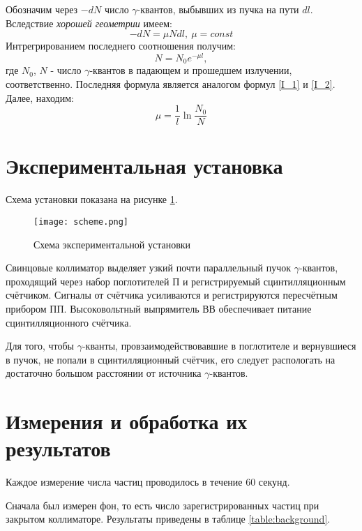 \documentclass[12pt, a4paper, reqno]{article}
\begin{document}
    Обозначим через $-dN$ число $\gamma$-квантов, выбывших из пучка на пути $dl$. Вследствие
    \textit{хорошей геометрии} имеем:
    \begin{equation*}
        -dN = \mu N dl,\ \mu = const
    \end{equation*}
    Интрегрированием последнего соотношения получим:
    \begin{equation*}
        N = N_0 e^{-\mu l},
    \end{equation*}
    где $N_0$, $N$ - число $\gamma$-квантов в падающем и прошедшем излучении, соответственно.
    Последняя формула является аналогом формул \eqref{I_1} и \eqref{I_2}. Далее, находим:
    \begin{equation}\label{mu_coeff}
        \boxed{\mu = \frac{1}{l}\ln{\frac{N_0}{N}}}
    \end{equation}

\newpage
\section{Экспериментальная установка}

    Схема установки показана на рисунке \ref{fig:scheme}.
    \begin{figure}[H]
        \centering
        \caption{Схема экспериментальной установки}
        \texttt{[image: scheme.png]}
        \label{fig:scheme}
    \end{figure}

    Свинцовые коллиматор выделяет узкий почти параллельный пучок $\gamma$-квантов, проходящий через
    набор поглотителей П и регистрируемый сцинтилляционным счётчиком. Сигналы от счётчика
    усиливаются и регистрируются пересчётным прибором ПП. Высоковольтный выпрямитель ВВ обеспечивает
    питание сцинтилляционного счётчика.

    Для того, чтобы $\gamma$-кванты, провзаимодействовавшие в поглотителе и вернувшиеся в пучок, не
    попали в сцинтилляционный счётчик, его следует распологать на достаточно большом расстоянии от
    источника $\gamma$-квантов.

\section{Измерения и обработка их результатов}

    Каждое измерение числа частиц проводилось в течение 60 секунд.

    Сначала был измерен фон, то есть число зарегистрированных частиц при закрытом коллиматоре.
    Результаты приведены в таблице \ref{table:background}.
\end{document}
